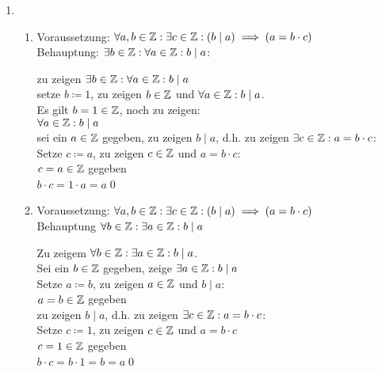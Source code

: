 \documentclass{gadsescript}
\begin{document}
\maketitle

\begin{enumerate}[label=(\alph*)]
	\item
		\begin{enumerate}[label=(\roman*)]
			\item Voraussetzung: $\forall a,b \in \mathbb{Z} : \exists c \in \mathbb{Z} : \left( b \mid a \right) \implies \left( a = b \cdot c \right) $\\
				Behauptung: $ \exists b \in \mathbb{Z} : \forall a \in \mathbb{Z} : b \mid a $:
				\begin{proof*}
					zu zeigen $\exists b \in \mathbb{Z} : \forall a \in \mathbb{Z} : b \mid a$\\
					setze $ b \coloneqq 1 $, zu zeigen $ b \in \mathbb{Z} $ und $ \forall a \in \mathbb{Z} : b \mid a $.\\
					Es gilt $  b = 1 \in \mathbb{Z} $, noch zu zeigen:\\
					$\forall a \in \mathbb{Z} : b \mid a $\\
					sei ein  $ a \in \mathbb{Z} $ gegeben, zu zeigen $ b \mid a $, d.h. zu zeigen $ \exists c \in \mathbb{Z} : a = b \cdot c $:\\
					Setze $ c \coloneqq a $, zu zeigen $ c \in \mathbb{Z} $ und $ a = b \cdot c $:\\
					$ c = a \in \mathbb{Z} $ gegeben\\
					$ b \cdot c = 1 \cdot a = a $\qed
				\end{proof*}
			\item Voraussetzung: $\forall a,b \in \mathbb{Z} : \exists c \in \mathbb{Z} : \left( b \mid a \right) \implies \left( a = b \cdot c \right) $\\
				Behauptung $ \forall b \in \mathbb{Z} : \exists a \in \mathbb{Z} : b \mid a $
				\begin{proof*}
					Zu zeigem $ \forall b \in \mathbb{Z} : \exists a \in \mathbb{Z} : b \mid a $.\\
					Sei ein $ b \in \mathbb{Z} $ gegeben, zeige $ \exists a \in \mathbb{Z} : b \mid a$\\
					Setze $ a \coloneqq b $, zu zeigen $ a \in \mathbb{Z} $ und $ b \mid a $:\\
					$ a = b \in \mathbb{Z} $ gegeben\\
					zu zeigen $ b \mid a $, d.h. zu zeigen $ \exists c \in \mathbb{Z} : a = b \cdot c $:\\
					Setze $ c \coloneqq 1 $, zu zeigen $ c \in \mathbb{Z} $ und $ a = b \cdot c $\\
					$ c = 1 \in \mathbb{Z} $ gegeben\\
					$ b \cdot c = b \cdot 1 = b = a $\qed
				\end{proof*}


\end{enumerate}
\end{enumerate}
\end{document}
